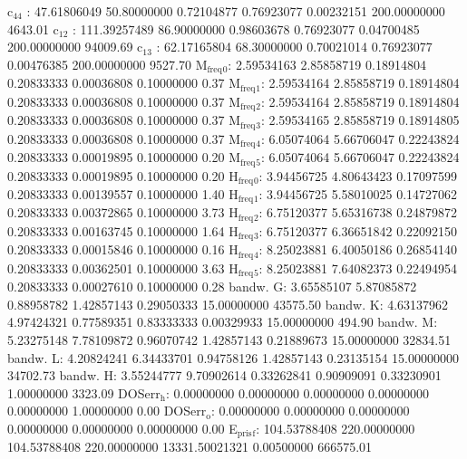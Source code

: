 \documentclass[11pt]{article}
\begin{document}
c\(_{\text{44}}\)    :  47.61806049  50.80000000   0.72104877   0.76923077   0.00232151 200.00000000      4643.01
c\(_{\text{12}}\)    : 111.39257489  86.90000000   0.98603678   0.76923077   0.04700485 200.00000000     94009.69
c\(_{\text{13}}\)    :  62.17165804  68.30000000   0.70021014   0.76923077   0.00476385 200.00000000      9527.70
M\(_{\text{freq}}\)\(_{\text{0}}\):   2.59534163   2.85858719   0.18914804   0.20833333   0.00036808   0.10000000         0.37
M\(_{\text{freq}}\)\(_{\text{1}}\):   2.59534164   2.85858719   0.18914804   0.20833333   0.00036808   0.10000000         0.37
M\(_{\text{freq}}\)\(_{\text{2}}\):   2.59534164   2.85858719   0.18914804   0.20833333   0.00036808   0.10000000         0.37
M\(_{\text{freq}}\)\(_{\text{3}}\):   2.59534165   2.85858719   0.18914805   0.20833333   0.00036808   0.10000000         0.37
M\(_{\text{freq}}\)\(_{\text{4}}\):   6.05074064   5.66706047   0.22243824   0.20833333   0.00019895   0.10000000         0.20
M\(_{\text{freq}}\)\(_{\text{5}}\):   6.05074064   5.66706047   0.22243824   0.20833333   0.00019895   0.10000000         0.20
H\(_{\text{freq}}\)\(_{\text{0}}\):   3.94456725   4.80643423   0.17097599   0.20833333   0.00139557   0.10000000         1.40
H\(_{\text{freq}}\)\(_{\text{1}}\):   3.94456725   5.58010025   0.14727062   0.20833333   0.00372865   0.10000000         3.73
H\(_{\text{freq}}\)\(_{\text{2}}\):   6.75120377   5.65316738   0.24879872   0.20833333   0.00163745   0.10000000         1.64
H\(_{\text{freq}}\)\(_{\text{3}}\):   6.75120377   6.36651842   0.22092150   0.20833333   0.00015846   0.10000000         0.16
H\(_{\text{freq}}\)\(_{\text{4}}\):   8.25023881   6.40050186   0.26854140   0.20833333   0.00362501   0.10000000         3.63
H\(_{\text{freq}}\)\(_{\text{5}}\):   8.25023881   7.64082373   0.22494954   0.20833333   0.00027610   0.10000000         0.28
bandw. G:   3.65585107   5.87085872   0.88958782   1.42857143   0.29050333  15.00000000     43575.50
bandw. K:   4.63137962   4.97424321   0.77589351   0.83333333   0.00329933  15.00000000       494.90
bandw. M:   5.23275148   7.78109872   0.96070742   1.42857143   0.21889673  15.00000000     32834.51
bandw. L:   4.20824241   6.34433701   0.94758126   1.42857143   0.23135154  15.00000000     34702.73
bandw. H:   3.55244777   9.70902614   0.33262841   0.90909091   0.33230901   1.00000000      3323.09
DOSerr\(_{\text{h}}\):   0.00000000   0.00000000   0.00000000   0.00000000   0.00000000   1.00000000         0.00
DOSerr\(_{\text{o}}\):   0.00000000   0.00000000   0.00000000   0.00000000   0.00000000   0.00000000         0.00
E\(_{\text{pris}}\)\(_{\text{f}}\): 104.53788408 220.00000000 104.53788408 220.00000000 13331.50021321
0.00500000    666575.01
\end{document}
